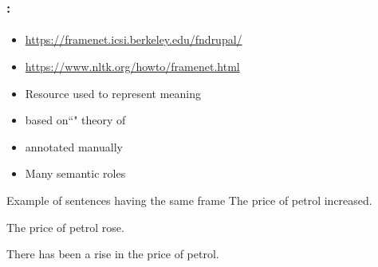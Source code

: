 \documentclass[xcolor=table]{beamer}
\begin{document}
\begin{frame}
	\frametitle{\insertshortsubtitle: \insertsection}
	\framesubtitle{\insertsubsection}

	\begin{minipage}{.68\textwidth}
		\begin{itemize}
			\item {\scriptsize \url{https://framenet.icsi.berkeley.edu/fndrupal/}}
			\item {\scriptsize \url{https://www.nltk.org/howto/framenet.html}}
			\item Resource used to represent meaning
			\item based on``" theory of 
			\item annotated manually
			\item Many semantic roles
		\end{itemize}
	\end{minipage}
	\begin{minipage}{.3\textwidth}
	\end{minipage}
	
	\begin{exampleblock}{Example of sentences having the same frame}
		The price of petrol increased.
		
		The price of petrol rose.
		
		There has been a rise in the price of petrol.
	\end{exampleblock}

\end{frame}
\end{document}
